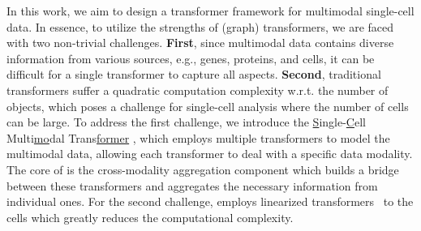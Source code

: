 In this work, we aim to design a transformer framework for multimodal single-cell  data. In essence, to utilize the strengths of (graph) transformers, we are faced with two non-trivial challenges.  \textbf{First}, since multimodal data contains diverse information from various sources, e.g., genes, proteins, and cells, it can be difficult for a single transformer to capture all aspects. \textbf{Second}, traditional transformers suffer a quadratic computation complexity w.r.t. the number of objects, which poses a challenge for single-cell analysis where the number of cells can be large. 
To address the first challenge, we introduce the \underline{S}ingle-\underline{C}ell Multi\underline{mo}dal Trans\underline{former} \method{}, which employs multiple transformers to model the multimodal data, allowing each transformer to deal with a specific data modality. The core of \method{} is the cross-modality aggregation component which builds a bridge between these transformers and aggregates the necessary information from individual ones.
For the second challenge, \method employs linearized transformers~\cite{choromanski2021rethinking} to the cells which greatly reduces the computational complexity.
